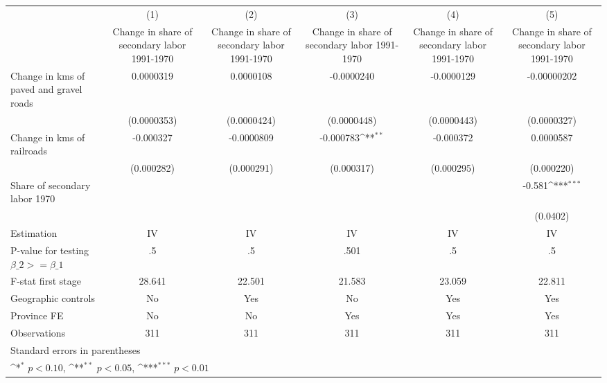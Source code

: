 {
\def\sym#1{\ifmmode^{#1}\else\(^{#1}\)\fi}
\begin{tabular}{l*{5}{c}}
\hline\hline
                    &\multicolumn{1}{c}{(1)}&\multicolumn{1}{c}{(2)}&\multicolumn{1}{c}{(3)}&\multicolumn{1}{c}{(4)}&\multicolumn{1}{c}{(5)}\\
                    &\multicolumn{1}{c}{Change in share of secondary labor 1991-1970}&\multicolumn{1}{c}{Change in share of secondary labor 1991-1970}&\multicolumn{1}{c}{Change in share of secondary labor 1991-1970}&\multicolumn{1}{c}{Change in share of secondary labor 1991-1970}&\multicolumn{1}{c}{Change in share of secondary labor 1991-1970}\\
\hline
Change in kms of paved and gravel roads&   0.0000319         &   0.0000108         &  -0.0000240         &  -0.0000129         & -0.00000202         \\
                    & (0.0000353)         & (0.0000424)         & (0.0000448)         & (0.0000443)         & (0.0000327)         \\
[1em]
Change in kms of railroads&   -0.000327         &  -0.0000809         &   -0.000783\sym{**} &   -0.000372         &   0.0000587         \\
                    &  (0.000282)         &  (0.000291)         &  (0.000317)         &  (0.000295)         &  (0.000220)         \\
[1em]
Share of secondary labor 1970&                     &                     &                     &                     &      -0.581\sym{***}\\
                    &                     &                     &                     &                     &    (0.0402)         \\
\hline
Estimation          &          IV         &          IV         &          IV         &          IV         &          IV         \\
P-value for testing $\beta\_2 >= \beta\_1$&          .5         &          .5         &        .501         &          .5         &          .5         \\
F-stat first stage  &      28.641         &      22.501         &      21.583         &      23.059         &      22.811         \\
Geographic controls &          No         &         Yes         &          No         &         Yes         &         Yes         \\
Province FE         &          No         &          No         &         Yes         &         Yes         &         Yes         \\
Observations        &         311         &         311         &         311         &         311         &         311         \\
\hline\hline
\multicolumn{6}{l}{\footnotesize Standard errors in parentheses}\\
\multicolumn{6}{l}{\footnotesize \sym{*} \(p<0.10\), \sym{**} \(p<0.05\), \sym{***} \(p<0.01\)}\\
\end{tabular}
}

